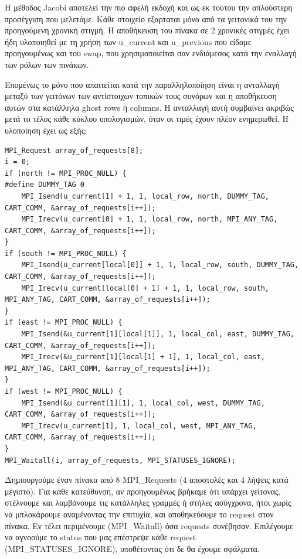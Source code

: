 \documentclass[12pt,titlepage]{article}
\begin{document}
Η μέθοδος Jacobi αποτελεί την πιο αφελή εκδοχή και ως εκ τούτου την απλούστερη
προσέγγιση που μελετάμε. Κάθε στοιχείο εξαρταται μόνο από τα γειτονικά του την
προηγούμενη χρονική στιγμή. Η αποθήκευση του πίνακα σε 2 χρονικές στιγμές έχει
ήδη υλοποιηθεί με τη χρήση των u\_current και u\_previous που είδαμε προηγουμένως
και του swap, που χρησιμοποιείται σαν ενδιάμεσος κατά την εναλλαγή των ρόλων των
πινάκων.

Επομένως το μόνο που απαιτείται κατά την παραλληλοποίηση είναι η ανταλλαγή
μεταξύ των γειτόνων των αντίστοιχων τοπικών τους συνόρων και η αποθήκευση αυτών
στα κατάλληλα ghost rows ή columns. Η ανταλλαγή αυτή συμβαίνει ακριβώς μετά το
τέλος κάθε κύκλου υπολογισμών, όταν οι τιμές έχουν πλέον ενημερωθεί. Η
υλοποίηση έχει ως εξής:

\begin{verbatim}
MPI_Request array_of_requests[8];
i = 0;
if (north != MPI_PROC_NULL) {
#define DUMMY_TAG 0
    MPI_Isend(u_current[1] + 1, 1, local_row, north, DUMMY_TAG, CART_COMM, &array_of_requests[i++]);
    MPI_Irecv(u_current[0] + 1, 1, local_row, north, MPI_ANY_TAG, CART_COMM, &array_of_requests[i++]);
}
if (south != MPI_PROC_NULL) {
    MPI_Isend(u_current[local[0]] + 1, 1, local_row, south, DUMMY_TAG, CART_COMM, &array_of_requests[i++]);
    MPI_Irecv(u_current[local[0] + 1] + 1, 1, local_row, south, MPI_ANY_TAG, CART_COMM, &array_of_requests[i++]);
}
if (east != MPI_PROC_NULL) {
    MPI_Isend(&u_current[1][local[1]], 1, local_col, east, DUMMY_TAG, CART_COMM, &array_of_requests[i++]);
    MPI_Irecv(&u_current[1][local[1] + 1], 1, local_col, east, MPI_ANY_TAG, CART_COMM, &array_of_requests[i++]);
}
if (west != MPI_PROC_NULL) {
    MPI_Isend(&u_current[1][1], 1, local_col, west, DUMMY_TAG, CART_COMM, &array_of_requests[i++]);
    MPI_Irecv(u_current[1], 1, local_col, west, MPI_ANY_TAG, CART_COMM, &array_of_requests[i++]);
}
MPI_Waitall(i, array_of_requests, MPI_STATUSES_IGNORE);
\end{verbatim}

Δημιουργούμε έναν πίνακα από 8 MPI\_Requests (4 αποστολές και 4 λήψεις κατά
μέγιστο). Για κάθε κατεύθυνση, αν προηγουμένως βρήκαμε ότι υπάρχει γείτονας,
στέλνουμε και λαμβάνουμε τις κατάλληλες γραμμές ή στήλες ασύγχρονα, ήτοι χωρίς
να μπλοκάρουμε αναμένοντας την επιτυχία, και αποθηκεύουμε το request στον
πίνακα. Εν τέλει περιμένουμε (MPI\_Waitall) όσα requests συνέβησαν. Επιλέγουμε να
αγνοούμε το status που μας επέστρεψε κάθε request (MPI\_STATUSES\_IGNORE),
υποθέτοντας ότι δε θα έχουμε σφάλματα.
\end{document}
